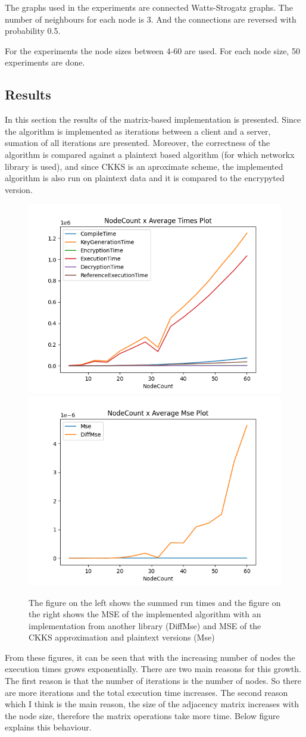 \documentclass{winslabreport}
\begin{document}
The graphs used in the experiments are connected Watts-Strogatz graphs. The number of neighbours for each node is 3. And the connections are reversed with probability 0.5.

For the experiments the node sizes between 4-60 are used. For each node size, 50 experiments are done.
\subsection{Results}
In this section the results of the matrix-based implementation is presented. Since the algorithm is implemented as iterations between a client and a server, sumation of all iterations are presented. Moreover, the correctness of the algorithm is compared against a plaintext based algorithm (for which networkx library is used), and since CKKS is an aproximate scheme, the implemented algorithm is also run on plaintext data and it is compared to the encrypyted version.
\begin{figure}[H]
	\centering
	\includegraphics[width=.45\textwidth]{figure/NodeCount x Average Times.png}
	\includegraphics[width=.45\textwidth]{figure/NodeCount x Average Mse.png}
	\caption{The figure on the left shows the summed run times and the figure on the right shows the MSE of the implemented algorithm with an implementation from another library (DiffMse) and MSE of the CKKS approximation and plaintext versions (Mse)}
\end{figure}

From these figures, it can be seen that with the increasing number of nodes the execution times grows exponentially. There are two main reasons for this growth. The first reason is that the number of iterations is the number of nodes. So there are more iterations and the total execution time increases. The second reason which I think is the main reason, the size of the adjacency matrix increases with the node size, therefore the matrix operations take more time. Below figure explains this behaviour.
\end{document}
